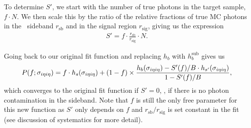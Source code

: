 To determine $S'$, we start with the number of true photons in the target sample, $f \cdot N$. 
We then scale this by the ratio of the relative fractions of true MC photons in the \ICH\ sideband $r_{\text{sb}}$ and in the signal region $r_{\text{sig}}$, giving us the expression
\begin{align}
  S' = f \cdot \frac{r_{\text{sb}}}{r_{\text{sig}}} \cdot N .
\end{align}

Going back to our original fit function and replacing $h_{b}$ with $h_{b}^{\text{sub}}$ gives us
\begin{align}
  P(f;\sigma_{i\eta i\eta}) = f \cdot h_{s}(\sigma_{i\eta i\eta}) + (1 - f) \times \frac{h_{b}(\sigma_{i\eta i\eta}) - S'(f)/B \cdot h_{s'}(\sigma_{i\eta i\eta})}{1 - S'(f)/B},
\end{align}
which converges to the original fit function if $S' = 0$, \ie, if there is no photon contamination in the sideband. 
Note that $f$ is still the only free parameter for this new function as $S'$ only depends on $f$ and $r_{\text{sb}} / r_{\text{sig}}$ is set constant in the fit (see discussion of systematics for more detail).

